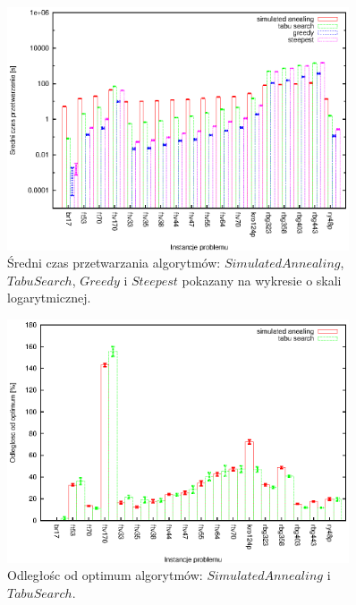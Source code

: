 \begin{figure}
\begin{center}
\includegraphics[width=0.9\textwidth]{wykresy/anealing_tabu_greedy_time_log}
\end{center}
\caption{Średni czas przetwarzania algorytmów: 
$Simulated Annealing$, $Tabu Search$, $Greedy$ i $Steepest$ pokazany na wykresie
o skali logarytmicznej.}
\label{anealing_tabu_greedy_time_log}
\end{figure}

\begin{figure}
\begin{center}
\includegraphics[width=0.9\textwidth]{wykresy/anealing_tabu_quality}
\end{center}
\caption{Odległośc od optimum algorytmów: $Simulated Annealing$ i 
$Tabu Search$.}
\label{anealing_tabu_quality}
\end{figure}

